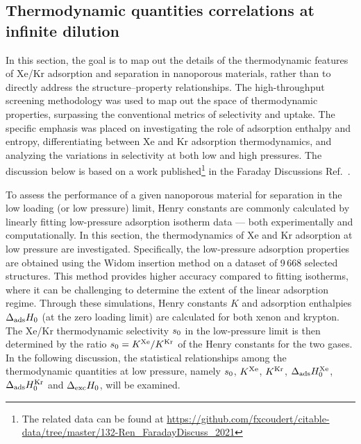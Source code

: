 \documentclass[main.tex]{subfiles}
\begin{document}
\subsection{Thermodynamic quantities correlations at infinite dilution}

In this section, the goal is to map out the details of the thermodynamic features of Xe/Kr adsorption and separation in nanoporous materials, rather than to directly address the structure--property relationships. The high-throughput screening methodology was used to map out the space of thermodynamic properties, surpassing the conventional metrics of selectivity and uptake. The specific emphasis was placed on investigating the role of adsorption enthalpy and entropy, differentiating between Xe and Kr adsorption thermodynamics, and analyzing the variations in selectivity at both low and high pressures. The discussion below is based on a work published\footnote[1]{The related data can be found at \url{https://github.com/fxcoudert/citable-data/tree/master/132-Ren_FaradayDiscuss_2021}} in the Faraday Discussions Ref.~\cite{Ren_2021}.

To assess the performance of a given nanoporous material for separation in the low loading (or low pressure) limit, Henry constants are commonly calculated by linearly fitting low-pressure adsorption isotherm data --- both experimentally and computationally. In this section, the thermodynamics of Xe and Kr adsorption at low pressure are investigated. Specifically, the low-pressure adsorption properties are obtained using the Widom insertion method\autocite{Widom1963, frenkel2001widom} on a dataset of 9\,668 selected structures. This method provides higher accuracy compared to fitting isotherms, where it can be challenging to determine the extent of the linear adsorption regime. Through these simulations, Henry constants $K$ and adsorption enthalpies $\Delta_{\text{ads}}H_{\text{0}}$ (at the zero loading limit) are calculated for both xenon and krypton. The Xe/Kr thermodynamic selectivity $s_{\text{0}}$ in the low-pressure limit is then determined by the ratio $s_{\text{0}} = K^{\text{Xe}}/K^{\text{Kr}}$ of the Henry constants for the two gases. In the following discussion, the statistical relationships among the thermodynamic quantities at low pressure, namely $s_{\text{0}}$, $K^{\text{Xe}}$, $K^{\text{Kr}}$, $\Delta_{\text{ads}}H_{\text{0}}^{\text{Xe}}$, $\Delta_{\text{ads}}H_{\text{0}}^{\text{Kr}}$ and $\Delta_{\text{exc}}H_{\text{0}}$, will be examined.
\end{document}
